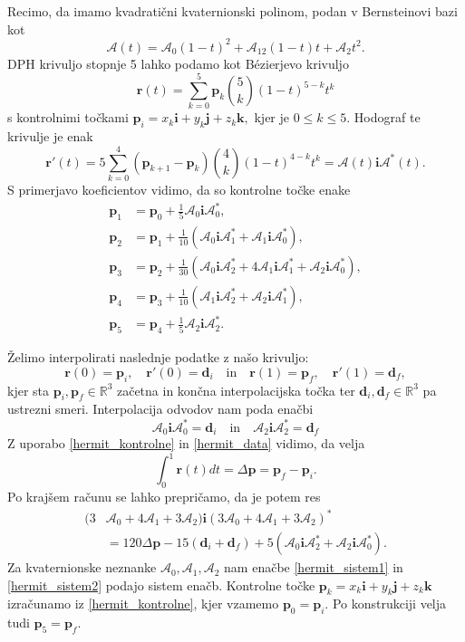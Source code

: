 \documentclass[12pt,a4paper,twoside]{article}
\theoremstyle{definition} %
\theoremstyle{plain} %
\theoremstyle{primerstyle}
\numberwithin{equation}{section}  %
\newcommand{\R}{\mathbb R}
\newcommand{\dV}{\mathbf{d}}
\newcommand{\pV}{\mathbf{p}}
\newcommand{\rV}{\mathbf{r}}
\newcommand{\iV}{\mathbf{i}}
\newcommand{\jV}{\mathbf{j}}
\newcommand{\kV}{\mathbf{k}}
\newcommand{\AQ}{\mathcal{A}}
\begin{document}
Recimo, da imamo kvadratični kvaternionski polinom, podan v Bernsteinovi bazi kot
\begin{equation*}
	\AQ(t)=\AQ_0(1-t)^2+\AQ_12(1-t)t+\AQ_2t^2.
\end{equation*}
DPH krivuljo stopnje 5 lahko podamo kot Bézierjevo krivuljo
\begin{equation*}
	\rV(t)=\sum_{k=0}^5\pV_k\binom{5}{k}(1-t)^{5-k}t^k
\end{equation*}
s kontrolnimi točkami $\pV_i=x_k\iV+y_k\jV+z_k\kV,$ kjer je $0\leq k\leq5.$ Hodograf te krivulje je enak
\begin{equation*}
	\rV'(t)=5\sum_{k=0}^4(\pV_{k+1}-\pV_k)\binom{4}{k}(1-t)^{4-k}t^k=\AQ(t)\iV\AQ^*(t).
\end{equation*}
S primerjavo koeficientov vidimo, da so kontrolne točke enake
\begin{align}
	\label{hermit_kontrolne}
	\pV_1&=\pV_0+\frac{1}{5}\AQ_0\iV\AQ_0^*,\nonumber\\
	\pV_2&=\pV_1+\frac{1}{10}(\AQ_0\iV\AQ_1^*+\AQ_1\iV\AQ_0^*),\nonumber\\
	\pV_3&=\pV_2+\frac{1}{30}(\AQ_0\iV\AQ_2^*+4\AQ_1\iV\AQ_1^*+\AQ_2\iV\AQ_0^*),\\
	\pV_4&=\pV_3+\frac{1}{10}(\AQ_1\iV\AQ_2^*+\AQ_2\iV\AQ_1^*),\nonumber\\
	\pV_5&=\pV_4+\frac{1}{5}\AQ_2\iV\AQ_2^*.\nonumber
\end{align}

Želimo interpolirati naslednje podatke z našo krivuljo:
\begin{equation}
	\label{hermit_data}
	\rV(0)=\pV_i,\quad\rV'(0)=\dV_i\quad\text{in}\quad\rV(1)=\pV_f,\quad\rV'(1)=\dV_f,
\end{equation}
kjer sta $\pV_i,\pV_f\in\R^3$ začetna in končna interpolacijska točka ter $\dV_i,\dV_f\in\R^3$ pa ustrezni smeri. Interpolacija odvodov nam poda enačbi
\begin{equation}
	\label{hermit_sistem1}
	\AQ_0\iV\AQ_0^*=\dV_i\quad\text{in}\quad\AQ_2\iV\AQ_2^*=\dV_f
\end{equation}
Z uporabo \eqref{hermit_kontrolne} in \eqref{hermit_data} vidimo, da velja
\begin{equation}
	\label{hermit_integral}
	\int_0^1\rV(t)dt=\Delta\pV=\pV_f-\pV_i.
\end{equation}
Po krajšem računu se lahko prepričamo, da je potem res
\begin{align}
	\label{hermit_sistem2}
	(3&\AQ_0+4\AQ_1+3\AQ_2)\iV(3\AQ_0+4\AQ_1+3\AQ_2)^*\nonumber\\
	&=120\Delta\pV-15(\dV_i+\dV_f)+5(\AQ_0\iV\AQ_2^*+\AQ_2\iV\AQ_0^*).
\end{align}
Za kvaternionske neznanke $\AQ_0,\AQ_1,\AQ_2$ nam enačbe \eqref{hermit_sistem1} in \eqref{hermit_sistem2} podajo sistem enačb. Kontrolne točke $\pV_k=x_k\iV+y_k\jV+z_k\kV$ izračunamo iz \eqref{hermit_kontrolne}, kjer vzamemo $\pV_0=\pV_i.$ Po konstrukciji velja tudi $\pV_5=\pV_f.$
\end{document}
